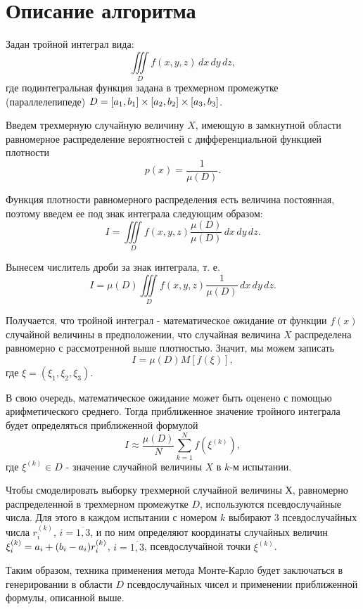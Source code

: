 \documentclass{report}
\begin{document}
\section*{Описание алгоритма}
\par Задан тройной интеграл вида:
$$\iiint\limits_D f(x,y,z) \,dx\,dy\,dz, $$
где подинтегральная функция задана в трехмерном промежутке (параллелепипеде) $D=[a_1,b_1]\times\*[a_2,b_2]\times[a_3,b_3]$.
\par Введем трехмерную случайную величину $X$, имеющую в замкнутной области равномерное распределение вероятностей с дифференциальной функцией плотности
$$p(x)=\frac{1}{\mu(D)}.$$
\par Функция плотности равномерного распределения есть величина постоянная, поэтому введем ее под знак интеграла следующим образом:
$$I=\iiint\limits_D f(x,y,z)\frac{\mu(D)}{\mu(D)} \,dx\,dy\,dz.$$
\par Вынесем числитель дроби за знак интеграла, т. е.
$$I=\mu(D)\iiint\limits_D f(x,y,z)\frac{1}{\mu(D)} \,dx\,dy\,dz.$$
\par Получается, что тройной интеграл - математическое ожидание от функции $f(x)$ случайной величины в предположении, что случайная величина $X$ распределена равномерно с рассмотренной выше плотностью. Значит, мы можем записать
$$I=\mu(D)M[f(\xi)],$$
где $\xi=(\xi_1,\xi_2,\xi_3)$.
\par В свою очередь, математическое ожидание может быть оценено с помощью арифметического среднего. Тогда приближенное значение тройного интеграла будет определяться приближенной формулой
$$I\approx\frac{\mu(D)}{N}\sum\limits_{k=1}^N f(\xi^{(k)}),$$
где $\xi^{(k)} \in D$ - значение случайной величины $X$ в $k$-м испытании.
\par Чтобы смоделировать выборку трехмерной случайной величины $Х$, равномерно распределенной в трехмерном промежутке $D$, используются псевдослучайные числа. Для этого в каждом испытании с номером $k$ выбирают 3 псевдослучайных числа $r_i^{(k)}$, $i=\overline{1,3}$, и по ним определяют координаты случайных величин $\xi_i^{(k)}=a_i+(b_i-a_i)\*r_i^{(k)}$, $i=\overline{1,3}$, псевдослучайной точки $\xi^{(k)}$.
\par Таким образом, техника применения метода Монте-Карло будет заключаться в генерировании в области $D$ псевдослучайных чисел и применении приближенной формулы, описанной выше.
\newpage

\end{document}
